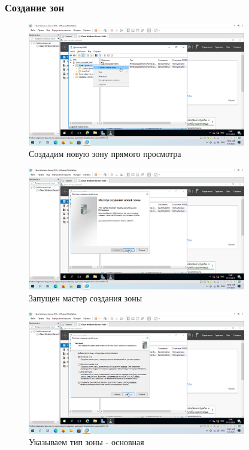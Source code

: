 \documentclass[a4paper]{article}
\begin{document}
  \subsubsection{Создание зон}

  \begin{figure}[H]
    \centering
    \includegraphics[width=0.85\textwidth]{9_0066}
    \caption{Создадим новую зону прямого просмотра}
    \label{img:0066}
  \end{figure}

  \begin{figure}[H]
    \centering
    \includegraphics[width=0.85\textwidth]{9_0067}
    \caption{Запущен мастер создания зоны}
    \label{img:0067}
  \end{figure}

  \begin{figure}[H]
    \centering
    \includegraphics[width=0.85\textwidth]{9_0068}
    \caption{Указываем тип зоны - основная}
    \label{img:0068}
  \end{figure}
\end{document}
